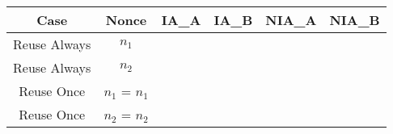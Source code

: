 \documentclass[crop]{standalone}
\newcommand{\attack}{\color{red}\usym{2717}\color{black}}
\begin{document}
\parbox{15cm}{
\begin{tabular}{|c|c|c|c|c|c|}
\hline
Case & Nonce & IA\_A & IA\_B & NIA\_A & NIA\_B \\ \hline
Reuse Always & $n_1$ & \attack & \attack & \attack & \attack\\ \hline
Reuse Always & $n_2$ & \attack & \attack & \attack & \attack\\ \hline
Reuse Once & $n_1$ = $n_1$ & \attack & \attack & \attack & \attack\\ \hline
Reuse Once & $n_2$ = $n_2$ & \attack & \attack & \attack & \attack\\ \hline
\end{tabular}}
\end{document}

